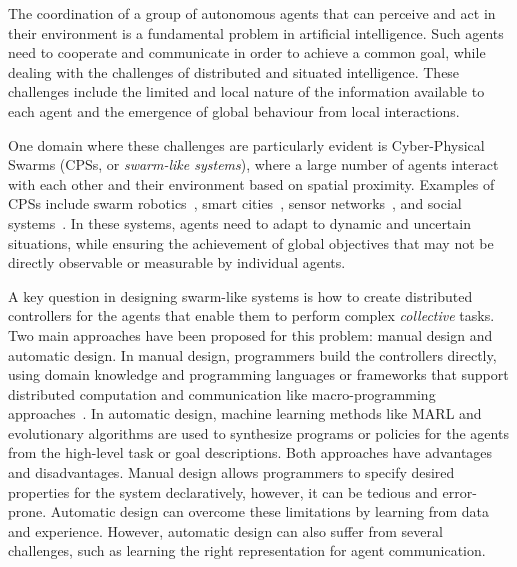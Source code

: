 The coordination of a group of autonomous agents that can perceive and act in their environment is a fundamental problem in artificial intelligence. 
Such agents need to cooperate and communicate in order to achieve a common goal, 
 while dealing with the challenges of distributed and situated intelligence. 
 These challenges include the limited and local nature of the information available to each agent and the emergence of global behaviour from local interactions. 

One domain where these challenges are particularly evident is Cyber-Physical Swarms (CPSs, or \emph{swarm-like systems}), 
 where a large number of agents interact with each other and their environment based on spatial proximity. 
%
Examples of CPSs include swarm robotics~\cite{brambilla2013swarm}, smart cities~\cite{bajovic2021marvel}, sensor networks~\cite{pianini2022collective}, and social systems~\cite{zhou2019cyber}. 
 In these systems, agents need to adapt to dynamic and uncertain situations, while ensuring the achievement of global objectives that may not be directly observable or measurable by individual agents.

A key question in designing swarm-like systems is how to create distributed controllers for the agents that enable them to perform complex \emph{collective} tasks. 
 Two main approaches have been proposed for this problem: manual design and automatic design. 
%
In manual design, programmers build the controllers directly, 
 using domain knowledge and programming languages or frameworks that support distributed computation and communication like macro-programming approaches~\cite{DBLP:journals/corr/abs-2201-03473}. 
%
In automatic design, machine learning methods like \ac{MARL} and evolutionary algorithms are used to synthesize programs or policies for the agents from the high-level task or goal descriptions.
%
Both approaches have advantages and disadvantages.
 Manual design allows programmers to specify desired properties for the system declaratively, however, it can be tedious and error-prone.
%
Automatic design can overcome these limitations by learning from data and experience. 
 However, automatic design can also suffer from several challenges, such as learning the right representation for agent communication.
%

